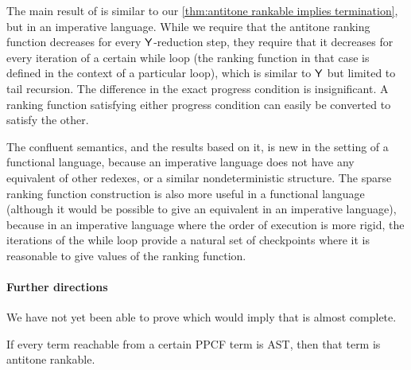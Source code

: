 The main result of \cite{DBLP:journals/pacmpl/McIverMKK18} is similar to our \cref{thm:antitone rankable implies termination}, but in an imperative language. While we require that the antitone ranking function decreases for every $\mathsf{Y}$-reduction step, they require that it decreases for every iteration of a certain while loop (the ranking function in that case is defined in the context of a particular loop), which is similar to $\mathsf{Y}$ but limited to tail recursion. 
The difference in the exact progress condition is insignificant. A ranking function satisfying either progress condition can easily be converted to satisfy the other.

The confluent semantics, and the results based on it, is new in the setting of a functional language, because an imperative language does not have any equivalent of other redexes, or a similar nondeterministic structure. The sparse ranking function construction is also more useful in a functional language (although it would be possible to give an equivalent in an imperative language), because in an imperative language where the order of execution is more rigid, the iterations of the while loop provide a natural set of checkpoints where it is reasonable to give values of the ranking function.

\paragraph*{Further directions} We have not yet been able to prove  which would imply that  is almost complete.
\begin{conjecture}[Completeness]
\label{conj:antitone}
If every term reachable from a certain PPCF term is AST, then that term is antitone rankable.
\end{conjecture}

